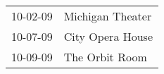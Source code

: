 \begin{supertabular}{p{0.07\textwidth}p{0.23\textwidth}}
 10-02-09 &  Michigan Theater \\
 10-07-09 &  City Opera House \\
 10-09-09 &    The Orbit Room \\
\end{supertabular}
